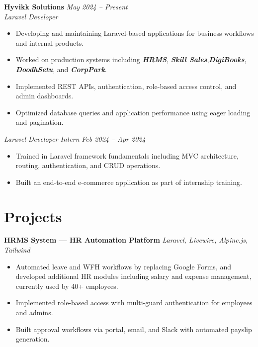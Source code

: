 \documentclass[10pt,a4paper]{article}
\begin{document}
\textbf{Hyvikk Solutions} \hfill \textit{May 2024 -- Present} \\
\vspace{2pt} %
\textit{Laravel Developer}
\begin{itemize}
  \item Developing and maintaining Laravel-based applications for business workflows and internal products.
  \item Worked on production systems including \textbf{\textit{HRMS}}, \textbf{\textit{Skill Sales}},\textbf{\textit{DigiBooks}}, \textbf{\textit{DoodhSetu}}, and \textbf{\textit{CorpPark}}.
  \item Implemented REST APIs, authentication, role-based access control, and admin dashboards.
  \item Optimized database queries and application performance using eager loading and pagination.
\end{itemize}


\vspace{4pt}
\textit{Laravel Developer Intern} \hfill \textit{Feb 2024 -- Apr 2024}
\begin{itemize}
  \item Trained in Laravel framework fundamentals including MVC architecture, routing, authentication, and CRUD operations.
  \item Built an end-to-end e-commerce application as part of internship training.
\end{itemize}


\section{Projects}

\textbf{HRMS System — HR Automation Platform} \hfill \textit{Laravel, Livewire, Alpine.js, Tailwind}
\vspace{2pt}
\begin{itemize}
  \item Automated leave and WFH workflows by replacing Google Forms, and developed additional HR modules including salary and expense management, currently used  by 40+ employees.
  \item Implemented role-based access with multi-guard authentication for employees and admins.
  \item Built approval workflows via portal, email, and Slack with automated payslip generation.
\end{itemize}
\end{document}
